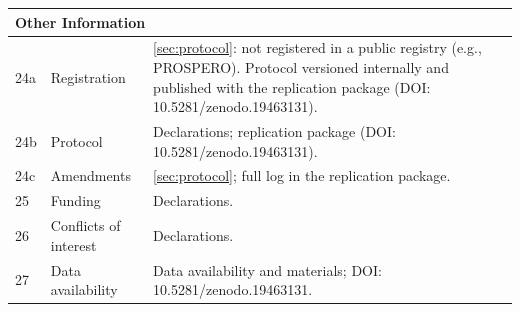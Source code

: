 \begin{longtable}{p{0.5cm}p{4.5cm}p{8.5cm}}
\midrule
\multicolumn{3}{l}{\textbf{Other Information}} \\
\midrule
24a & Registration
    & \autoref{sec:protocol}: not registered in a public registry (e.g.,
      PROSPERO). Protocol versioned internally and published with the
      replication package (DOI: 10.5281/zenodo.19463131). \\
24b & Protocol
    & Declarations; replication package (DOI: 10.5281/zenodo.19463131). \\
24c & Amendments
    & \autoref{sec:protocol}; full log in the replication package. \\
25  & Funding
    & Declarations. \\
26  & Conflicts of interest
    & Declarations. \\
27  & Data availability
    & Data availability and materials; DOI: 10.5281/zenodo.19463131. \\
\end{longtable}
